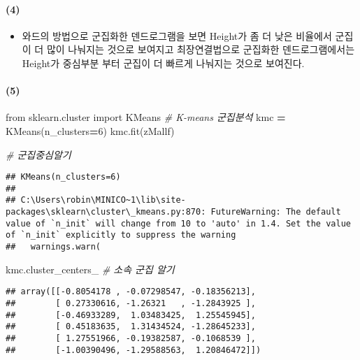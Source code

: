 \documentclass[
]{article}
\newenvironment{Shaded}{\begin{snugshade}}{\end{snugshade}}
\newcommand{\CommentTok}[1]{\textcolor[rgb]{0.56,0.35,0.01}{\textit{#1}}}
\newcommand{\DecValTok}[1]{\textcolor[rgb]{0.00,0.00,0.81}{#1}}
\newcommand{\ImportTok}[1]{#1}
\newcommand{\NormalTok}[1]{#1}
\newcommand{\OperatorTok}[1]{\textcolor[rgb]{0.81,0.36,0.00}{\textbf{#1}}}
\providecommand{\tightlist}{%
  \setlength{\itemsep}{0pt}\setlength{\parskip}{0pt}}
\begin{document}
\hypertarget{section-23}{%
\paragraph{(4)}\label{section-23}}

\begin{itemize}
\tightlist
\item
  와드의 방법으로 군집화한 덴드로그램을 보면 Height가 좀 더 낮은
  비율에서 군집이 더 많이 나눠지는 것으로 보여지고 최장연결법으로
  군집화한 덴드로그램에서는 Height가 중심부분 부터 군집이 더 빠르게
  나눠지는 것으로 보여진다.
\end{itemize}

\hypertarget{section-24}{%
\paragraph{(5)}\label{section-24}}

\begin{Shaded}
\begin{Highlighting}[]
\ImportTok{from}\NormalTok{ sklearn.cluster }\ImportTok{import}\NormalTok{ KMeans}
\CommentTok{\# K{-}means 군집분석}
\NormalTok{kmc }\OperatorTok{=}\NormalTok{ KMeans(n\_clusters}\OperatorTok{=}\DecValTok{6}\NormalTok{)}
\NormalTok{kmc.fit(zMallf)}

\CommentTok{\# 군집중심알기}
\end{Highlighting}
\end{Shaded}

\begin{verbatim}
## KMeans(n_clusters=6)
## 
## C:\Users\robin\MINICO~1\lib\site-packages\sklearn\cluster\_kmeans.py:870: FutureWarning: The default value of `n_init` will change from 10 to 'auto' in 1.4. Set the value of `n_init` explicitly to suppress the warning
##   warnings.warn(
\end{verbatim}

\begin{Shaded}
\begin{Highlighting}[]
\NormalTok{kmc.cluster\_centers\_}
\CommentTok{\# 소속 군집 알기}
\end{Highlighting}
\end{Shaded}

\begin{verbatim}
## array([[-0.8054178 , -0.07298547, -0.18356213],
##        [ 0.27330616, -1.26321   , -1.2843925 ],
##        [-0.46933289,  1.03483425,  1.25545945],
##        [ 0.45183635,  1.31434524, -1.28645233],
##        [ 1.27551966, -0.19382587, -0.1068539 ],
##        [-1.00390496, -1.29588563,  1.20846472]])
\end{verbatim}
\end{document}
